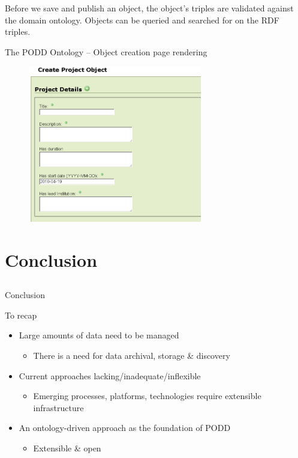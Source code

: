 \documentclass[ignorenonframetext,compress]{beamer}
\begin{document}
Before we save and publish an object, the object's triples are validated against
the domain ontology. Objects can be queried and searched for on the RDF triples.

\begin{frame}{The PODD Ontology -- Object creation page rendering}
 \begin{figure}[t]
  \begin{center}
  \includegraphics[width=76mm]{create.png}
   \end{center}
 \end{figure}
\end{frame}

\section{Conclusion}
\subsection*{ }
\begin{frame}{Conclusion}
\begin{block}{To recap}
\begin{itemize}
\item Large amounts of data need to be managed
    \begin{itemize}
    \item There is a need for data archival, storage \& discovery
    \end{itemize}
\item Current approaches lacking/inadequate/inflexible
    \begin{itemize}
    \item Emerging processes, platforms, technologies require extensible infrastructure
    \end{itemize}
\item An ontology-driven approach as the foundation of PODD
    \begin{itemize}
    \item Extensible \& open
    \end{itemize}
\end{itemize}
\end{block}
\end{frame}
\end{document}
